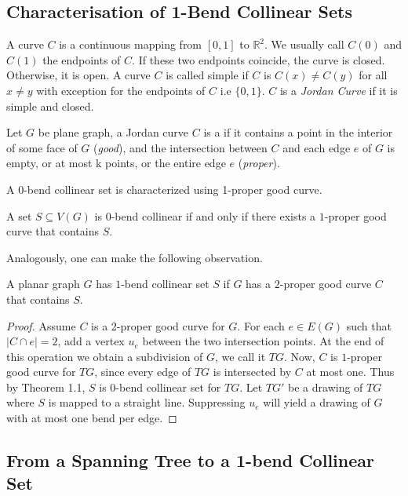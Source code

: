 \subsection{Characterisation of 1-Bend Collinear Sets}
A curve $C$ is a continuous mapping from $[0, 1]$ to $\mathbb{R}^2$. We usually call $C(0)$ and $C(1)$ the endpoints of $C$. If these two endpoints coincide, the curve is closed. Otherwise, it is open. A curve $C$ is called simple if $C$ is $C(x) \neq C(y)$ for all $x \neq y$ with exception for the endpoints of $C$ i.e $\{0, 1\}$. $C$ is a \textit{Jordan Curve} if it is simple and closed. 

Let $G$ be plane graph, a Jordan curve $C$ is a  if it contains a point in the interior of some face of $G$ (\textit{good}), and the intersection between $C$ and each edge $e$ of $G$ is empty, or at most k points, or the entire edge $e$ (\textit{proper}).

A $0$-bend collinear set is characterized using 1-proper good curve.

\begin{thm}
A set $S \subseteq V(G)$ is 0-bend collinear if and only if there exists a $1$-proper good curve that contains $S$.
\end{thm}

Analogously, one can make the following observation.
\begin{observation} {\label{new_topo}}
    A planar graph $G$ has $1$-bend collinear set $S$ if $G$ has a $2$-proper good curve $C$ that contains $S$.
\end{observation}
\begin{proof}
Assume $C$ is a 2-proper good curve for $G$. For each $e \in E(G)$ such that $|C \cap e| = 2$, add a vertex $u_e$ between the two intersection points. At the end of this operation we obtain a subdivision of $G$, we call it $TG$. Now, $C$ is $1$-proper good curve for $TG$, since every edge of $TG$ is intersected by $C$ at most one. Thus by Theorem 1.1, $S$ is 0-bend collinear set for $TG$. Let $TG'$ be a drawing of $TG$ where $S$ is mapped to a straight line. Suppressing $u_e$ will yield a drawing of $G$ with at most one bend per edge.  
\end{proof}

\subsection{From a Spanning Tree to a 1-bend Collinear Set}

